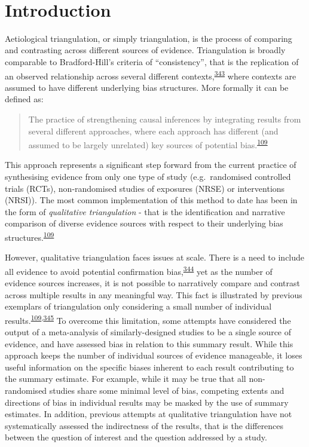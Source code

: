 \documentclass[a4paper, twoside]{templates/ociamthesis}
\begin{document}
~

\hypertarget{triangulation-overview}{%
\section{Introduction}\label{triangulation-overview}}

Aetiological triangulation, or simply triangulation, is the process of comparing and contrasting across different sources of evidence. Triangulation is broadly comparable to Bradford-Hill's criteria of ``consistency'', that is the replication of an observed relationship across several different contexts,\textsuperscript{\protect\hyperlink{ref-hill1965}{343}} where contexts are assumed to have different underlying bias structures. More formally it can be defined as:

\begin{quote}
The practice of strengthening causal inferences by integrating results from several different approaches, where each approach has different (and assumed to be largely unrelated) key sources of potential bias.\textsuperscript{\protect\hyperlink{ref-lawlor2016}{109}}
\end{quote}

This approach represents a significant step forward from the current practice of synthesising evidence from only one type of study (e.g.~randomised controlled trials (RCTs), non-randomised studies of exposures (NRSE) or interventions (NRSI)). The most common implementation of this method to date has been in the form of \emph{qualitative triangulation} - that is the identification and narrative comparison of diverse evidence sources with respect to their underlying bias structures.\textsuperscript{\protect\hyperlink{ref-lawlor2016}{109}}

However, qualitative triangulation faces issues at scale. There is a need to include all evidence to avoid potential confirmation bias,\textsuperscript{\protect\hyperlink{ref-dubroff2018}{344}} yet as the number of evidence sources increases, it is not possible to narratively compare and contrast across multiple results in any meaningful way. This fact is illustrated by previous exemplars of triangulation only considering a small number of individual results.\textsuperscript{\protect\hyperlink{ref-lawlor2016}{109},\protect\hyperlink{ref-ference2014}{345}} To overcome this limitation, some attempts have considered the output of a meta-analysis of similarly-designed studies to be a single source of evidence, and have assessed bias in relation to this summary result. While this approach keeps the number of individual sources of evidence manageable, it loses useful information on the specific biases inherent to each result contributing to the summary estimate. For example, while it may be true that all non-randomised studies share some minimal level of bias, competing extents and directions of bias in individual results may be masked by the use of summary estimates. In addition, previous attempts at qualitative triangulation have not systematically assessed the indirectness of the results, that is the differences between the question of interest and the question addressed by a study.
\end{document}
